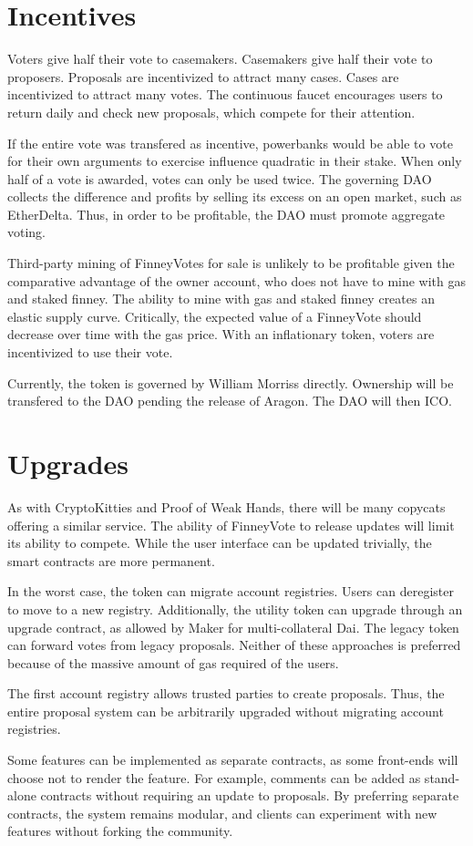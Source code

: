 \documentclass{article}
\begin{document}
\section{Incentives}
Voters give half their vote to casemakers.
Casemakers give half their vote to proposers.
Proposals are incentivized to attract many cases.
Cases are incentivized to attract many votes.
The continuous faucet encourages users to return daily and check new proposals, which compete for their attention.
\par
If the entire vote was transfered as incentive, powerbanks would be able to vote for their own arguments to exercise influence quadratic in their stake.
When only half of a vote is awarded, votes can only be used twice.
The governing DAO collects the difference and profits by selling its excess on an open market, such as EtherDelta.
Thus, in order to be profitable, the DAO must promote aggregate voting.
\par
Third-party mining of FinneyVotes for sale is unlikely to be profitable given the comparative advantage of the owner account, who does not have to mine with gas and staked finney.
The ability to mine with gas and staked finney creates an elastic supply curve.
Critically, the expected value of a FinneyVote should decrease over time with the gas price.
With an inflationary token, voters are incentivized to use their vote.
\par
Currently, the token is governed by William Morriss directly.
Ownership will be transfered to the DAO pending the release of Aragon.
The DAO will then ICO.
\section{Upgrades}
As with CryptoKitties and Proof of Weak Hands, there will be many copycats offering a similar service.
The ability of FinneyVote to release updates will limit its ability to compete.
While the user interface can be updated trivially, the smart contracts are more permanent.
\par
In the worst case, the token can migrate account registries.
Users can deregister to move to a new registry.
Additionally, the utility token can upgrade through an upgrade contract, as allowed by Maker for multi-collateral Dai.
The legacy token can forward votes from legacy proposals.
Neither of these approaches is preferred because of the massive amount of gas required of the users.
\par
The first account registry allows trusted parties to create proposals.
Thus, the entire proposal system can be arbitrarily upgraded without migrating account registries.
\par
Some features can be implemented as separate contracts, as some front-ends will choose not to render the feature.
For example, comments can be added as stand-alone contracts without requiring an update to proposals.
By preferring separate contracts, the system remains modular, and clients can experiment with new features without forking the community.
\end{document}
